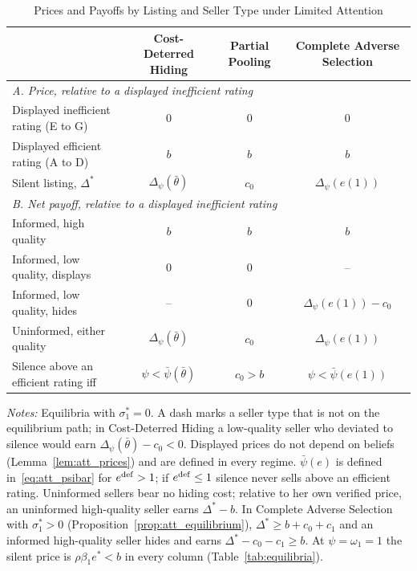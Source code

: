 \begin{table}[htbp]
\centering
\caption{Prices and Payoffs by Listing and Seller Type under Limited Attention}
\label{tab:att_seller_types}
\small\renewcommand{\arraystretch}{1.5}
\begin{tabular*}{\textwidth}{@{\extracolsep{\fill}}lccc@{}}
\toprule\toprule
 & \textbf{Cost-Deterred Hiding} & \textbf{Partial Pooling} & \textbf{Complete Adverse Selection} \\
\midrule
\multicolumn{4}{l}{\textit{A. Price, relative to a displayed inefficient rating}} \\
Displayed inefficient rating (E to G) & $0$ & $0$ & $0$ \\
Displayed efficient rating (A to D) & $b$ & $b$ & $b$ \\
Silent listing, $\Delta^*$ & $\Delta_\psi(\bar\theta)$ & $c_0$ & $\Delta_\psi(e(1))$ \\
\midrule
\multicolumn{4}{l}{\textit{B. Net payoff, relative to a displayed inefficient rating}} \\
Informed, high quality & $b$ & $b$ & $b$ \\
Informed, low quality, displays & $0$ & $0$ & -- \\
Informed, low quality, hides & -- & $0$ & $\Delta_\psi(e(1))-c_0$ \\
Uninformed, either quality & $\Delta_\psi(\bar\theta)$ & $c_0$ & $\Delta_\psi(e(1))$ \\
\midrule
Silence above an efficient rating iff & $\psi<\bar\psi(\bar\theta)$ & $c_0>b$ & $\psi<\bar\psi(e(1))$ \\
\bottomrule\bottomrule
\end{tabular*}

\vspace{0.5em}
\raggedright
\footnotesize
\textit{Notes:} Equilibria with $\sigma_1^*=0$. A dash marks a seller type that is not on the equilibrium path; in Cost-Deterred Hiding a low-quality seller who deviated to silence would earn $\Delta_\psi(\bar\theta)-c_0<0$. Displayed prices do not depend on beliefs (Lemma~\ref{lem:att_prices}) and are defined in every regime. $\bar\psi(e)$ is defined in~\eqref{eq:att_psibar} for $e^{\rm def}>1$; if $e^{\rm def}\le1$ silence never sells above an efficient rating. Uninformed sellers bear no hiding cost; relative to her own verified price, an uninformed high-quality seller earns $\Delta^*-b$. In Complete Adverse Selection with $\sigma_1^*>0$ (Proposition~\ref{prop:att_equilibrium}), $\Delta^*\ge b+c_0+c_1$ and an informed high-quality seller hides and earns $\Delta^*-c_0-c_1\ge b$. At $\psi=\omega_1=1$ the silent price is $\rho\beta_1e^*<b$ in every column (Table~\ref{tab:equilibria}).
\end{table}

